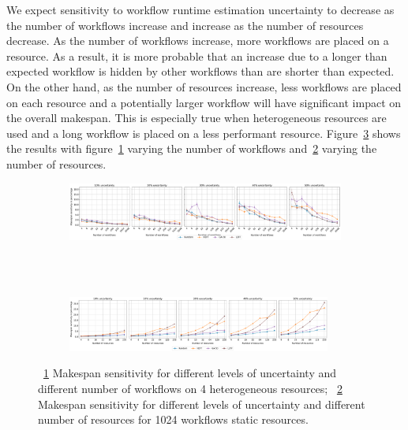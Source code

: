 We expect sensitivity to workflow runtime estimation uncertainty to decrease
as the number of workflows increase and increase as the number of resources
decrease. As the number of workflows  increase, more workflows are placed on a
resource. As a result, it is more probable that an increase due to a longer
than expected workflow is hidden by other workflows than are shorter than
expected. On the other hand, as the number of resources increase, less
workflows are placed on each resource and a potentially larger workflow will
have significant impact on the overall makespan. This is especially true when
heterogeneous resources are used and a long workflow is placed on a less
performant resource. Figure~\ref{fig:inaccur_st} shows the results with
figure~\ref{fig:InaccurStHeteroCampaigns_4StHeteroResourcesSens} varying the
number of workflows
and~\ref{fig:InaccurStHeteroResources_StHeteroCampaignsSens} varying the
number of resources.

\begin{figure}[ht!]
    \centering
    \begin{subfigure}[b]{0.95\textwidth}
        \includegraphics[width=.95\textwidth]{figures/campaign/InaccurStHeteroCampaigns_4StHeteroResourcesSens.pdf}
        \caption{}
        \label{fig:InaccurStHeteroCampaigns_4StHeteroResourcesSens}
    \end{subfigure}\\
    ~
    \begin{subfigure}[b]{0.95\textwidth}
        \includegraphics[width=0.95\textwidth]{figures/campaign/InaccurStHeteroResources_StHeteroCampaignsSens.pdf}
        \caption{}
        \label{fig:InaccurStHeteroResources_StHeteroCampaignsSens}
    \end{subfigure}
    \caption{~\ref{fig:InaccurStHeteroCampaigns_4StHeteroResourcesSens} Makespan sensitivity for different levels of uncertainty and different number of workflows on 4 heterogeneous resources;
    ~\ref{fig:InaccurStHeteroResources_StHeteroCampaignsSens} Makespan sensitivity for different levels of uncertainty and different number of resources for 1024 workflows static resources.}
    \label{fig:inaccur_st}
\end{figure}


